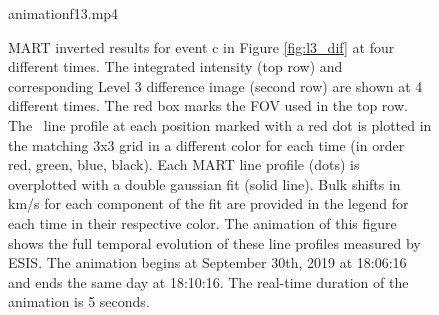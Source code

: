 \documentclass[linenumbers,trackchanges]{aastex63}
\begin{document}
   
    	\begin{figure}
    		\begin{interactive}{animation}{f13.mp4}
    		\end{interactive}
    		\caption{MART inverted results for event c in Figure \ref{fig:l3_dif} at four different times. 
    			The integrated intensity (top row) and corresponding Level 3 difference image (second row) are shown at 4 different times. The red box marks the FOV used in the top row.  
    			The \ov \ line profile at each position marked with a red dot is plotted in the matching 3x3 grid in a different color for each time (in order red, green, blue, black). 
    			Each MART line profile (dots) is overplotted with a double gaussian fit (solid line).  
    			Bulk shifts in km/s for each component of the fit are provided in the legend for each time in their respective color. 
The animation of this figure shows the full temporal evolution of these line profiles measured by ESIS. The animation begins at September 30th, 2019 at 18:06:16 and ends the same day at 18:10:16. The real-time duration of the animation is 5 seconds.  }
    		\label{fig:perfect_x_inverted}
    	\end{figure}
    
\end{document}
